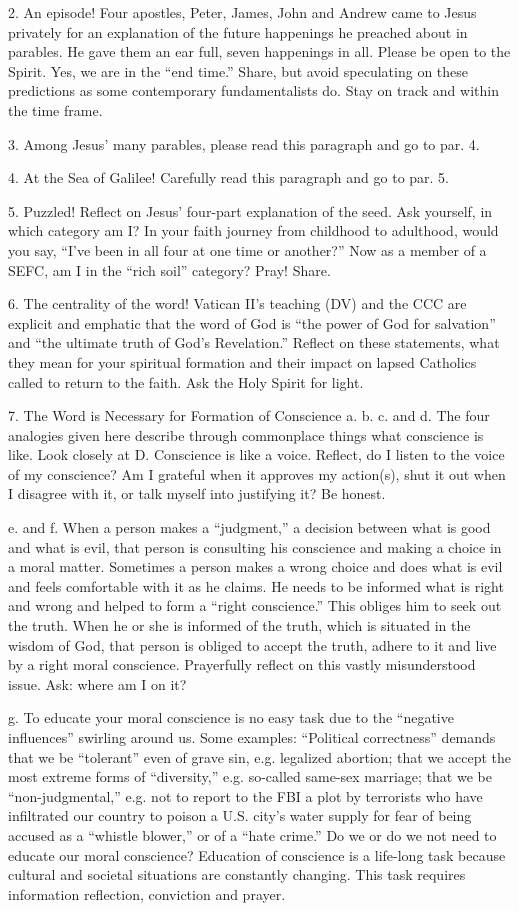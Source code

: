 \documentclass[oneside]{book}
\begin{document}
2. An episode! Four apostles, Peter, James, John and Andrew came to Jesus
privately for an explanation of the future happenings he preached about in
parables. He gave them an ear full, seven happenings in all. Please be open to
the Spirit. Yes, we are in the ``end time.'' Share, but avoid speculating on
these predictions as some contemporary fundamentalists do. Stay on track and
within the time frame.

3. Among Jesus' many parables, please read this paragraph and go to par. 4.

4. At the Sea of Galilee! Carefully read this paragraph and go to par. 5.

5. Puzzled! Reflect on Jesus' four-part explanation of the seed. Ask yourself,
in which category am I? In your faith journey from childhood to adulthood, would
you say, ``I've been in all four at one time or another?'' Now as a member of a
SEFC, am I in the ``rich soil'' category? Pray! Share.

6. The centrality of the word! Vatican II's teaching (DV) and the CCC are
explicit and emphatic that the word of God is ``the power of God for salvation''
and ``the ultimate truth of God's Revelation.'' Reflect on these statements,
what they mean for your spiritual formation and their impact on lapsed Catholics
called to return to the faith. Ask the Holy Spirit for light.

7. The Word is Necessary for Formation of Conscience
a. b. c. and d. The four analogies given here describe through commonplace
things what conscience is like. Look closely at D. Conscience is like a
voice. Reflect, do I listen to the voice of my conscience? Am I grateful when it
approves my action(s), shut it out when I disagree with it, or talk myself into
justifying it? Be honest.

e. and f. When a person makes a ``judgment,'' a decision between what is good
and what is evil, that person is consulting his conscience and making a choice
in a moral matter. Sometimes a person makes a wrong choice and does what is evil
and feels comfortable with it as he claims. He needs to be informed what is
right and wrong and helped to form a ``right conscience.'' This obliges him to
seek out the truth. When he or she is informed of the truth, which is situated
in the wisdom of God, that person is obliged to accept the truth, adhere to it
and live by a right moral conscience. Prayerfully reflect on this vastly
misunderstood issue. Ask: where am I on it?

g. To educate your moral conscience is no easy task due to the ``negative
influences'' swirling around us. Some examples: ``Political correctness''
demands that we be ``tolerant'' even of grave sin, e.g. legalized abortion; that
we accept the most extreme forms of ``diversity,'' e.g. so-called same-sex
marriage; that we be ``non-judgmental,'' e.g. not to report to the FBI a plot by
terrorists who have infiltrated our country to poison a U.S. city's water supply
for fear of being accused as a ``whistle blower,'' or of a ``hate crime.'' Do we
or do we not need to educate our moral conscience? Education of conscience is a
life-long task because cultural and societal situations are constantly
changing. This task requires information reflection, conviction and prayer.
\end{document}

